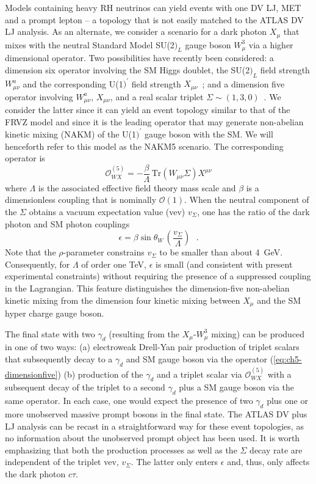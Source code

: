 Models containing heavy RH neutrinos can yield events with one DV LJ, MET and a prompt lepton -- a topology that is not easily matched to the ATLAS DV LJ analysis. As an alternate, we consider a scenario for a dark photon $X_\mu$ that mixes with the neutral Standard Model SU(2$)_L$ gauge boson $W_\mu^3$ via a higher dimensional operator. Two possibilities have recently been considered: a dimension six operator involving the SM Higgs doublet, the SU(2$)_L$ field strength $W_{\mu\nu}^a$ and the corresponding U(1$)^\prime$ field strength $X_{\mu\nu}$~\cite{Barello:2015bhq}; and a dimension five operator involving $W_{\mu\nu}^a$, $X_{\mu\nu}$, and a real scalar triplet $\Sigma\sim (1,3,0)$~\cite{Arguelles:2016ney}. We consider the latter since it can yield an event topology similar to that of the FRVZ model and since it is the leading operator that may generate non-abelian kinetic mixing (NAKM) of the U(1$)^\prime$ gauge boson with the SM. We will henceforth refer to this model as the NAKM5 scenario.
%
The corresponding operator is
\begin{equation}
\label{eq:ch5-dimensionfive}
\mathcal{O}_{WX}^{(5)} = 
-\frac{\beta}{\Lambda}\,\text{Tr}\left(W_{\mu\nu}\Sigma\right) X^{\mu\nu}
\end{equation}
where $\Lambda$ is the associated effective field theory mass scale and $\beta$ is a dimensionless coupling that is nominally $\mathcal{O}(1)$. When the neutral component of the $\Sigma$ obtains a vacuum expectation value (vev) $v_\Sigma$, one has the ratio of the dark photon and SM photon couplings 
\begin{equation}
\label{eq:ch5-dimfiveeps}
\epsilon = {\beta\sin\theta_W}\, \left(\frac{v_\Sigma}{\Lambda}\right)\ \ \  .
\end{equation}
Note that the $\rho$-parameter constrains $v_\Sigma$ to be smaller than about \mbox{4~GeV}. Consequently, for $\Lambda$ of order one TeV, $\epsilon$ is small (and consistent with present experimental constraints) without requiring the presence of a suppressed coupling in the Lagrangian. This feature distinguishes the dimension-five non-abelian kinetic mixing from the dimension four kinetic mixing between $X_\mu$ and the SM hyper charge gauge boson. 

The final state with two $\gamma_d$ (resulting from the $X_\mu$-$W_\mu^3$ mixing) can be produced in one of two ways: (a) electroweak Drell-Yan pair production of  triplet scalars that subsequently decay to a $\gamma_d$ and SM gauge boson via the operator (\ref{eq:ch5-dimensionfive}) (b) production of the $\gamma_d$ and a triplet scalar via $\mathcal{O}_{WX}^{(5)}$ with a subsequent decay of the triplet to a second $\gamma_d$ plus a SM gauge boson via the same operator. In each case, one would expect the presence of two $\gamma_d$ plus one or more unobserved massive prompt bosons in the final state. The ATLAS DV plus LJ analysis can be recast in a straightforward way for these event topologies, as no information about the unobserved prompt object has been used. It is worth emphasizing that both the production processes as well as the $\Sigma$ decay rate are independent of the triplet vev, $v_\Sigma$. The latter only enters $\epsilon$ and, thus, only affects the dark photon $c\tau$. 

